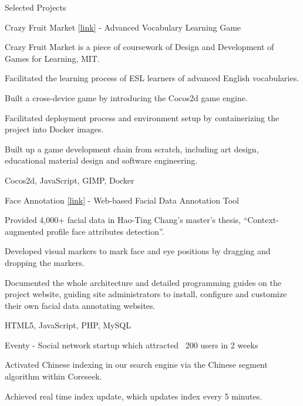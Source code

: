 \documentclass{cv}
\begin{document}
\begin{cvSection}{Selected Projects}

\begin{projectSubsection}{Crazy Fruit Market  \href{http://jasson15.github.io/crazy-fruit-market}{[link]}}{ - }{Advanced Vocabulary Learning Game}

\item Crazy Fruit Market is a piece of coursework of Design and Development of Games for Learning, MIT.
\item Facilitated the learning process of ESL learners of advanced English vocabularies.
\item Built a cross-device game by introducing the Cocos2d game engine.
\item Facilitated deployment process and environment setup by containerizing the project into Docker images.
\item Built up a game development chain from scratch, including art design, educational material design and software engineering.
\item Cocos2d, JavaScript, GIMP, Docker

\end{projectSubsection}

\begin{projectSubsection}
{Face Annotation \href{http://cmlab.csie.ntu.edu.tw/~pi/face_annotation}{[link]}}
{ - }
{Web-based Facial Data Annotation Tool}
\item Provided 4,000+ facial data in Hao-Ting Chang's master's thesis, ``Context-augmented profile face attributes detection''.
\item Developed visual markers to mark face and eye positions by dragging and dropping the markers.
\item Documented the whole architecture and detailed programming guides on the project website, guiding site administrators to install, configure and customize their own facial data annotating websites.
\item HTML5, JavaScript, PHP, MySQL

\end{projectSubsection}

\begin{projectSubsection}
{Eventy}
{ - }
{Social network startup which attracted ~200 users in 2 weeks}
\item Activated Chinese indexing in our search engine via the Chinese segment algorithm within Coreseek.
\item Achieved real time index update, which updates index every 5 minutes.


\end{projectSubsection}
\end{cvSection}
\end{document}
